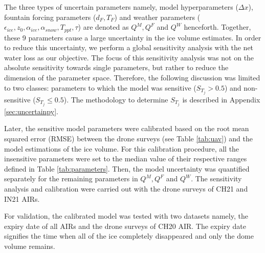 \documentclass[utf8]{frontiersSCNS}
\begin{document}
The three types of uncertain parameters namely, model hyperparameters ($\Delta x$), fountain forcing parameters
($d_F, T_F$) and weather parameters ($\epsilon_{ice}, z_0, \alpha_{ice}, \alpha_{snow}, T_{ppt}, \tau$) are
denoted as $Q^M, Q^F$ and $Q^W$ henceforth. Together, these 9 parameters cause a large uncertainty in the ice
volume estimates. In order to reduce this uncertainty, we perform a global sensitivity analysis with the net
water loss as our objective. The focus of this sensitivity analysis was not on the absolute sensitivity towards
single parameters, but rather to reduce the dimension of the parameter space. Therefore, the following
discussion was limited to two classes: parameters to which the model was sensitive ($S_{T_{j}} > 0.5$) and
non-sensitive ($S_{T_{j}} \leq 0.5$). The methodology to determine $S_{T_{j}}$ is described in Appendix
\ref{sec:uncertainpy}.

Later, the sensitive model parameters were calibrated based on the root mean squared error (RMSE) between the
drone surveys (see Table \ref{tab:uav}) and the model estimations of the ice volume. For this calibration
procedure, all the insensitive parameters were set to the median value of their respective ranges defined in
Table \ref{tab:parameters}. Then, the model uncertainty was quantified separately for the remaining parameters
in $Q^M, Q^F$ and $Q^W$. The sensitivity analysis and calibration were carried out with the drone surveys of CH21
and IN21 AIRs. 

For validation, the calibrated model was tested with two datasets namely, the expiry date of all AIRs and the
drone surveys of CH20 AIR. The expiry date signifies the time when all of the ice completely disappeared and only
the dome volume remains.
\end{document}
